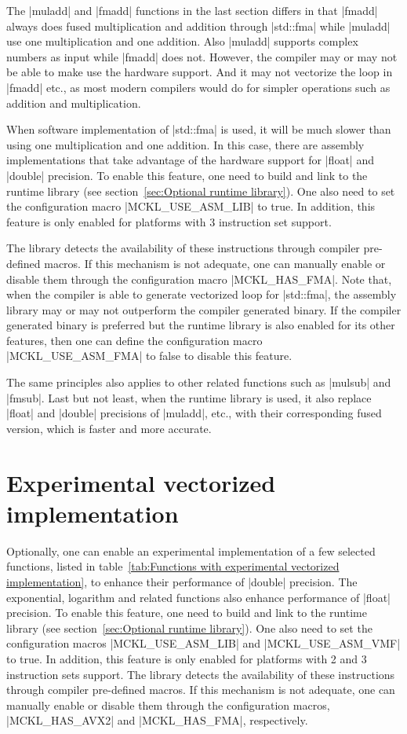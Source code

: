The |muladd| and |fmadd| functions in the last section differs in that |fmadd|
always does fused multiplication and addition through |std::fma| while |muladd|
use one multiplication and one addition. Also |muladd| supports complex numbers
as input while |fmadd| does not. However, the compiler may or may not be able
to make use the hardware \fma support. And it may not vectorize the loop in
|fmadd| etc., as most modern \cpp compilers would do for simpler operations
such as addition and multiplication.

When software implementation of |std::fma| is used, it will be much slower than
using one multiplication and one addition. In this case, there are assembly
implementations that take advantage of the hardware support for |float| and
|double| precision. To enable this feature, one need to build and link to the
runtime library (see section~\ref{sec:Optional runtime library}). One also need
to set the configuration macro |MCKL_USE_ASM_LIB| to true. In addition, this
feature is only enabled for platforms with \fma{}3 instruction set support.

The library detects the availability of these instructions through compiler
pre-defined macros. If this mechanism is not adequate, one can manually enable
or disable them through the configuration macro |MCKL_HAS_FMA|. Note that, when
the compiler is able to generate vectorized loop for |std::fma|, the assembly
library may or may not outperform the compiler generated binary. If the
compiler generated binary is preferred but the runtime library is also enabled
for its other features, then one can define the configuration macro
|MCKL_USE_ASM_FMA| to false to disable this feature.

The same principles also applies to other related functions such as |mulsub|
and |fmsub|. Last but not least, when the runtime library is used, it also
replace |float| and |double| precisions of |muladd|, etc., with their
corresponding fused version, which is faster and more accurate.

\section{Experimental vectorized implementation}
\label{sec:Experimental vectorized implementation}

Optionally, one can enable an experimental implementation of a few selected
functions, listed in table~\ref{tab:Functions with experimental vectorized
  implementation}, to enhance their performance of |double| precision. The
exponential, logarithm and related functions also enhance performance of
|float| precision. To enable this feature, one need to build and link to the
runtime library (see section~\ref{sec:Optional runtime library}). One also need
to set the configuration macros |MCKL_USE_ASM_LIB| and |MCKL_USE_ASM_VMF| to
true. In addition, this feature is only enabled for platforms with \avx{}2 and
\fma{}3 instruction sets support. The library detects the availability of these
instructions through compiler pre-defined macros. If this mechanism is not
adequate, one can manually enable or disable them through the configuration
macros, |MCKL_HAS_AVX2| and |MCKL_HAS_FMA|, respectively.

